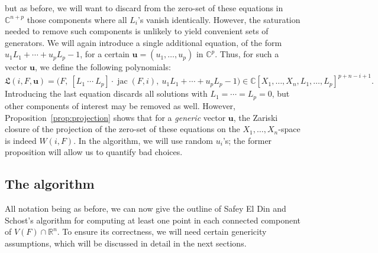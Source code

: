 \documentclass[12pt]{article}
\def\frkL{\mathfrak{L}}
\def\Xb{\textit{\textbf{X}}}
\def\ub{{\bm u}}
\DeclareMathOperator{\jac}{jac}
\def\C{\mathbb{C}}
\def\R{\mathbb{R}}
\def\la{\langle}
\def\ra{\rangle}
\newtheorem{ex}[theorem]{Example}
\begin{document}
but as before, we will want to discard from the zero-set of these
equations in $\C^{n+p}$ those components where all $L_i$'s vanish
identically. However, the saturation needed to remove such components
is unlikely to yield convenient sets of generators.  We will again
introduce a single additional equation, of the form $u_1 L_1 + \cdots
+ u_p L_p -1$, for a certain $\bm u = (u_1,\dots,u_p)$ in
$\C^p$. Thus, for such a vector $\ub$, we define the following
polynomials:
\begin{equation}\label{eqdef:Iil}
\frkL(i,F,\bm u)= 
\big (F,\ [L_1~\cdots~L_p]\cdot \jac(F, i),\ u_1 L_1 + \cdots + u_p L_p -1 \big )
\in \C[X_1,\dots,X_n,L_1,\dots,L_p]^{p+n-i+1}.
\end{equation}
Introducing the last equation discards all solutions with $L_1 =
\cdots = L_p =0$, but other components of interest may be removed as
well. However, Proposition~\ref{prop:projection} shows that for a {\em
  generic} vector $\bm u$, the Zariski closure of the projection of
the zero-set of these equations on the $X_1,\dots,X_n$-space is indeed
$W(i,F)$.  In the algorithm, we will use random $u_i$'s; the former
proposition will allow us to quantify bad choices.



\subsection{The algorithm}

All notation being as before, we can now give the outline of Safey El
Din and Schost's algorithm for computing at least one point in each
connected component of $V(F) \cap\R^n$. To ensure its correctness, we
will need certain genericity assumptions, which will be discussed in
detail in the next sections.
\end{document}
